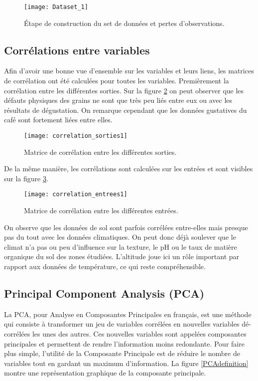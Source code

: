 \begin{figure}[H]
	\texttt{[image: Dataset\_1]}
	\caption{\label{DatasetMaking} Étape de construction du set de données et pertes d'observations.}
\end{figure}


\subsection{Corrélations entre variables}

Afin d'avoir une bonne vue d'ensemble sur les variables et leurs liens, les matrices de corrélation ont été calculées pour toutes les variables. Premièrement la corrélation entre les différentes sorties. Sur la figure \ref{correlation_sorties1} on peut observer que les défauts physiques des grains ne sont que très peu liés entre eux ou avec les résultats de dégustation. On remarque cependant que les données gustatives du café sont fortement liées entre elles. 

\begin{figure}[H]
	\texttt{[image: correlation\_sorties1]}
	\caption{\label{correlation_sorties1} Matrice de corrélation entre les différentes sorties.}
\end{figure}


De la même manière, les corrélations sont calculées sur les entrées et sont visibles sur la figure \ref{correlation_entrees1}. 


\begin{figure}[H]
	\texttt{[image: correlation\_entrees1]}
	\caption{\label{correlation_entrees1} Matrice de corrélation entre les différentes entrées.}
\end{figure}


On observe que les données de sol sont parfois corrélées entre-elles mais presque pas du tout avec les données climatiques. On peut donc déjà soulever que le climat n'a pas ou peu d'influence sur la texture, le pH ou le taux de matière organique du sol des zones étudiées. L'altitude joue ici un rôle important par rapport aux données de température, ce qui reste compréhensible. 












\newpage
\subsection{Principal Component Analysis (PCA)}\label{PCAss}
La PCA, pour Analyse en Composantes Principales en français, est une méthode qui consiste à transformer un jeu de variables corrélées en nouvelles variables dé-corrélées les unes des autres. Ces nouvelles variables sont appelées composantes principales et permettent de rendre l'information moins redondante. Pour faire plus simple, l'utilité de la Composante Principale est de réduire le nombre de variables tout en gardant un maximum d'information. La figure \ref{PCAdefinition} montre une représentation graphique de la composante principale. 


